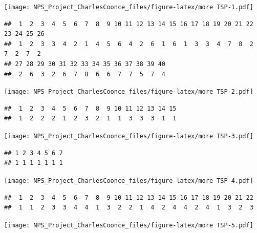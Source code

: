 \documentclass[
]{article}
\newenvironment{Shaded}{\begin{snugshade}}{\end{snugshade}}
\newcommand{\AttributeTok}[1]{\textcolor[rgb]{0.13,0.29,0.53}{#1}}
\newcommand{\CommentTok}[1]{\textcolor[rgb]{0.56,0.35,0.01}{\textit{#1}}}
\newcommand{\ControlFlowTok}[1]{\textcolor[rgb]{0.13,0.29,0.53}{\textbf{#1}}}
\newcommand{\FunctionTok}[1]{\textcolor[rgb]{0.13,0.29,0.53}{\textbf{#1}}}
\newcommand{\NormalTok}[1]{#1}
\newcommand{\SpecialCharTok}[1]{\textcolor[rgb]{0.81,0.36,0.00}{\textbf{#1}}}
\newcommand{\StringTok}[1]{\textcolor[rgb]{0.31,0.60,0.02}{#1}}
\begin{document}
\begin{Shaded}
\end{Shaded}

\texttt{[image: NPS\_Project\_CharlesCoonce\_files/figure-latex/more TSP-1.pdf]}

\begin{verbatim}
##  1  2  3  4  5  6  7  8  9 10 11 12 13 14 15 16 17 18 19 20 21 22 23 24 25 26 
##  1  2  3  3  4  2  1  4  5  6  4  2  6  1  6  1  3  3  4  7  8  2  7  2  7  2 
## 27 28 29 30 31 32 33 34 35 36 37 38 39 40 
##  2  6  3  2  6  7  8  6  6  7  7  5  7  4
\end{verbatim}

\texttt{[image: NPS\_Project\_CharlesCoonce\_files/figure-latex/more TSP-2.pdf]}

\begin{verbatim}
##  1  2  3  4  5  6  7  8  9 10 11 12 13 14 15 
##  1  2  2  2  1  2  3  2  1  1  3  3  3  1  1
\end{verbatim}

\texttt{[image: NPS\_Project\_CharlesCoonce\_files/figure-latex/more TSP-3.pdf]}

\begin{verbatim}
## 1 2 3 4 5 6 7 
## 1 1 1 1 1 1 1
\end{verbatim}

\texttt{[image: NPS\_Project\_CharlesCoonce\_files/figure-latex/more TSP-4.pdf]}

\begin{verbatim}
##  1  2  3  4  5  6  7  8  9 10 11 12 13 14 15 16 17 18 19 20 21 22 
##  1  1  2  3  3  4  4  1  3  2  2  1  4  2  4  4  2  4  1  3  2  3
\end{verbatim}

\texttt{[image: NPS\_Project\_CharlesCoonce\_files/figure-latex/more TSP-5.pdf]}
\end{document}
